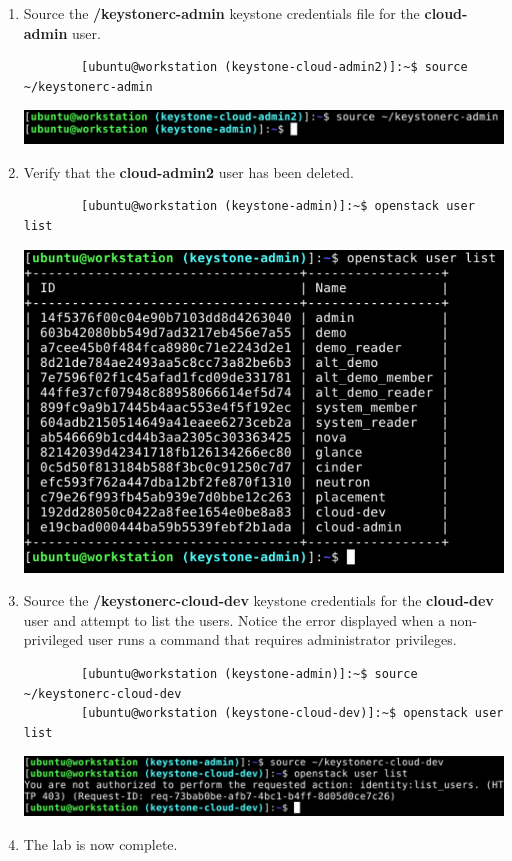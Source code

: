 \documentclass[letterpaper, 12pt]{article}
\begin{document}
\begin{enumerate}
    \item Source the \textbf{\texttildemid/keystonerc-admin} keystone credentials file for the \textbf{cloud-admin}
    user.
    \begin{lstlisting}
        [ubuntu@workstation (keystone-cloud-admin2)]:~$ source ~/keystonerc-admin
    \end{lstlisting}

    \begin{center}
        \includegraphics[width=\linewidth]{images/part6/step13.png}
    \end{center}

    \item Verify that the \textbf{cloud-admin2} user has been deleted.
    \begin{lstlisting}
        [ubuntu@workstation (keystone-admin)]:~$ openstack user list
    \end{lstlisting}

    \begin{center}
        \includegraphics[width=\linewidth]{images/part6/step14.png}
    \end{center}

    \item Source the \textbf{\texttildemid/keystonerc-cloud-dev} keystone credentials for the \textbf{cloud-dev} user and
    attempt to list the users. Notice the error displayed when a non-privileged user runs a command that requires
    administrator privileges.
    \begin{lstlisting}
        [ubuntu@workstation (keystone-admin)]:~$ source ~/keystonerc-cloud-dev
        [ubuntu@workstation (keystone-cloud-dev)]:~$ openstack user list
    \end{lstlisting}

    \begin{center}
        \includegraphics[width=\linewidth]{images/part6/step15.png}
    \end{center}

    \item The lab is now complete.

\end{enumerate}
\end{document}
